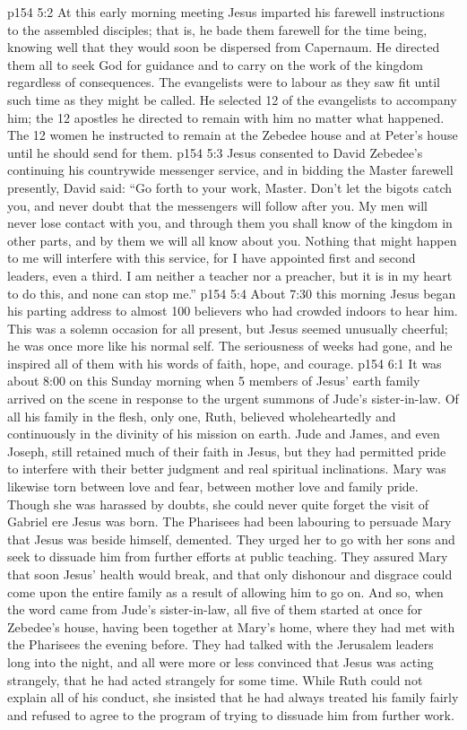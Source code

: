 \vs p154 5:2 At this early morning meeting Jesus imparted his farewell instructions to the assembled disciples; that is, he bade them farewell for the time being, knowing well that they would soon be dispersed from Capernaum. He directed them all to seek God for guidance and to carry on the work of the kingdom regardless of consequences. The evangelists were to labour as they saw fit until such time as they might be called. He selected 12 of the evangelists to accompany him; the 12 apostles he directed to remain with him no matter what happened. The 12 women he instructed to remain at the Zebedee house and at Peter’s house until he should send for them.
\vs p154 5:3 Jesus consented to David Zebedee’s continuing his countrywide messenger service, and in bidding the Master farewell presently, David said: “Go forth to your work, Master. Don’t let the bigots catch you, and never doubt that the messengers will follow after you. My men will never lose contact with you, and through them you shall know of the kingdom in other parts, and by them we will all know about you. Nothing that might happen to me will interfere with this service, for I have appointed first and second leaders, even a third. I am neither a teacher nor a preacher, but it is in my heart to do this, and none can stop me.”
\vs p154 5:4 About 7:30 this morning Jesus began his parting address to almost 100 believers who had crowded indoors to hear him. This was a solemn occasion for all present, but Jesus seemed unusually cheerful; he was once more like his normal self. The seriousness of weeks had gone, and he inspired all of them with his words of faith, hope, and courage.
\vs p154 6:1 It was about 8:00 on this Sunday morning when 5 members of Jesus’ earth family arrived on the scene in response to the urgent summons of Jude’s sister\hyp{}in\hyp{}law. Of all his family in the flesh, only one, Ruth, believed wholeheartedly and continuously in the divinity of his mission on earth. Jude and James, and even Joseph, still retained much of their faith in Jesus, but they had permitted pride to interfere with their better judgment and real spiritual inclinations. Mary was likewise torn between love and fear, between mother love and family pride. Though she was harassed by doubts, she could never quite forget the visit of Gabriel ere Jesus was born. The Pharisees had been labouring to persuade Mary that Jesus was beside himself, demented. They urged her to go with her sons and seek to dissuade him from further efforts at public teaching. They assured Mary that soon Jesus’ health would break, and that only dishonour and disgrace could come upon the entire family as a result of allowing him to go on. And so, when the word came from Jude’s sister\hyp{}in\hyp{}law, all five of them started at once for Zebedee’s house, having been together at Mary’s home, where they had met with the Pharisees the evening before. They had talked with the Jerusalem leaders long into the night, and all were more or less convinced that Jesus was acting strangely, that he had acted strangely for some time. While Ruth could not explain all of his conduct, she insisted that he had always treated his family fairly and refused to agree to the program of trying to dissuade him from further work.
